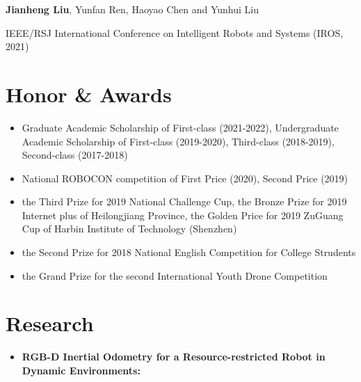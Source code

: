 \documentclass[11pt,a4paper,sans]{moderncv}        %
\begin{document}
\begin{CJK*}{UTF8}{gbsn}
{\begin{itemize}
{\small{\textbf{Jianheng Liu}, Yunfan Ren, Haoyao Chen and Yunhui Liu}

\small{IEEE/RSJ International Conference on Intelligent Robots and Systems (IROS, 2021) }
}


\end{itemize}

\section{Honor \& Awards}

\vspace{6pt}

\begin{itemize}

\item{Graduate Academic Scholarship of First-class (2021-2022), Undergraduate Academic Scholarship of First-class (2019-2020), Third-class (2018-2019), Second-class (2017-2018)}

\item{National ROBOCON competition of First Price (2020), Second Price (2019)}

\item{the Third Prize for 2019 National Challenge Cup, the Bronze Prize for 2019 Internet plus of Heilongjiang Province, the Golden Price for 2019  ZuGuang Cup of Harbin Institute of Technology (Shenzhen)}

\item{the Second Prize for 2018 National English Competition for College Strudents}

\item{the Grand Prize for the second International Youth Drone Competition}

\end{itemize}


\section{Research}

\vspace{6pt}

\begin{itemize}

\item \textbf{RGB-D Inertial Odometry for a Resource-restricted Robot in Dynamic Environments:} 


\end{itemize}}
\end{CJK*}
\end{document}
